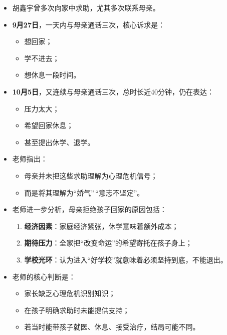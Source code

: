 \documentclass[
  chinese,
  9pt,
  a4paper,
]{ctexart}
\providecommand{\tightlist}{%
  \setlength{\itemsep}{0pt}\setlength{\parskip}{0pt}}
\begin{document}
\begin{itemize}
\item
  胡鑫宇曾多次向家中求助，尤其多次联系母亲。
\item
  \textbf{9月27日}，一天内与母亲通话三次，核心诉求是：

  \begin{itemize}
  \tightlist
  \item
    想回家；
  \item
    学不进去；
  \item
    想休息一段时间。
  \end{itemize}
\item
  \textbf{10月5日}，又连续与母亲通话三次，总时长近40分钟，仍在表达：

  \begin{itemize}
  \tightlist
  \item
    压力太大；
  \item
    希望回家休息；
  \item
    甚至提出休学、退学。
  \end{itemize}
\item
  老师指出：

  \begin{itemize}
  \tightlist
  \item
    母亲并未把这些求助理解为心理危机信号；
  \item
    而是将其理解为``娇气''\,``意志不坚定''。
  \end{itemize}
\item
  老师进一步分析，母亲拒绝孩子回家的原因包括：

  \begin{enumerate}
  \def\labelenumi{\arabic{enumi}.}
  \tightlist
  \item
    \textbf{经济因素}：家庭经济紧张，休学意味着额外成本；
  \item
    \textbf{期待压力}：全家把``改变命运''的希望寄托在孩子身上；
  \item
    \textbf{学校光环}：认为进入``好学校''就意味着必须坚持到底，不能退出。
  \end{enumerate}
\item
  老师的核心判断是：

  \begin{itemize}
  \tightlist
  \item
    家长缺乏心理危机识别知识；
  \item
    在孩子明确求助时未能提供支持；
  \item
    若当时能带孩子就医、休息、接受治疗，结局可能不同。
  \end{itemize}
\end{itemize}
\end{document}

